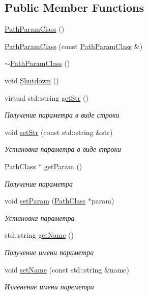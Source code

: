\subsection*{Public Member Functions}
\begin{DoxyCompactItemize}
\item 
\hyperlink{class_path_param_class_a145bffa31ef9b240e5fe2d49ace5550a}{Path\+Param\+Class} ()
\item 
\hyperlink{class_path_param_class_ae6304495145e685152d81146d1322bd4}{Path\+Param\+Class} (const \hyperlink{class_path_param_class}{Path\+Param\+Class} \&)
\item 
\hyperlink{class_path_param_class_a5b1b0c3f8b4aa0d00ed9ac33f242d794}{$\sim$\+Path\+Param\+Class} ()
\item 
void \hyperlink{class_path_param_class_a24f272557eaa32ca6ee758932a7e5a97}{Shutdown} ()
\item 
virtual std\+::string \hyperlink{class_path_param_class_ae5ab6701e81608546f1d0c1495355c05}{get\+Str} ()
\begin{DoxyCompactList}\small\item\em Получение параметра в виде строки \end{DoxyCompactList}\item 
void \hyperlink{class_path_param_class_a714cb515a6b746c83f81606a73b3e9dc}{set\+Str} (const std\+::string \&str)
\begin{DoxyCompactList}\small\item\em Установка параметра в виде строки \end{DoxyCompactList}\item 
\hyperlink{class_path_class}{Path\+Class} $\ast$ \hyperlink{class_path_param_class_a2ba9e408b295705570e381dcb7a72040}{get\+Param} ()
\begin{DoxyCompactList}\small\item\em Получение параметра \end{DoxyCompactList}\item 
void \hyperlink{class_path_param_class_a6990892369167db4bca6a3adb013c294}{set\+Param} (\hyperlink{class_path_class}{Path\+Class} $\ast$param)
\begin{DoxyCompactList}\small\item\em Установка параметра \end{DoxyCompactList}\item 
std\+::string \hyperlink{class_set_param_class_a6c14fce9f4a896f6470888f3cacfb025}{get\+Name} ()
\begin{DoxyCompactList}\small\item\em Получение имени параметра \end{DoxyCompactList}\item 
void \hyperlink{class_set_param_class_aeabf85ad5a078ab4abb8f09a67f2c8e0}{set\+Name} (const std\+::string \&name)
\begin{DoxyCompactList}\small\item\em Изменение имени пареметра \end{DoxyCompactList}\end{DoxyCompactItemize}
